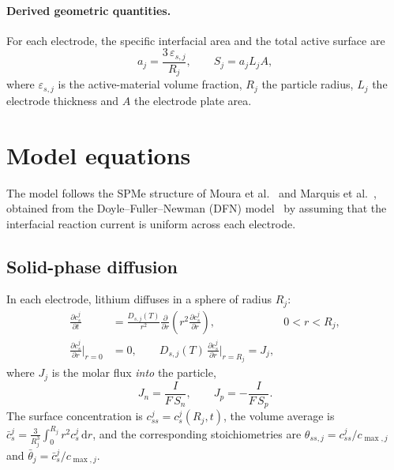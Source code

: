 \documentclass[11pt]{article}
\newcommand{\cs}{c_{s}}
\newcommand{\css}{c_{ss}}
\newcommand{\eps}{\varepsilon}
\newcommand{\dd}{\mathrm{d}}
\newcommand{\pd}[2]{\frac{\partial #1}{\partial #2}}
\begin{document}
\paragraph{Derived geometric quantities.} For each electrode, the specific interfacial area and the total active surface are
\begin{equation}
a_j=\frac{3\,\eps_{s,j}}{R_j},\qquad S_j=a_j L_j A ,
\end{equation}
where $\eps_{s,j}$ is the active-material volume fraction, $R_j$ the particle radius, $L_j$ the electrode thickness and $A$ the electrode plate area.

\section{Model equations}\label{sec:model}

The model follows the SPMe structure of Moura et al.~\cite{moura2017} and Marquis et al.~\cite{marquis2019}, obtained from the Doyle--Fuller--Newman (DFN) model~\cite{doyle1993} by assuming that the interfacial reaction current is uniform across each electrode.

\subsection{Solid-phase diffusion}
In each electrode, lithium diffuses in a sphere of radius $R_j$:
\begin{align}
\pd{\cs^{j}}{t} &= \frac{D_{s,j}(T)}{r^{2}}\pd{}{r}\!\left(r^{2}\pd{\cs^{j}}{r}\right), & 0<r<R_j, \label{eq:solid}\\
\pd{\cs^{j}}{r}\Big|_{r=0} &= 0, \qquad D_{s,j}(T)\,\pd{\cs^{j}}{r}\Big|_{r=R_j}=J_j ,
\end{align}
where $J_j$ is the molar flux \emph{into} the particle,
\begin{equation}
J_n=\frac{I}{F\,S_n},\qquad J_p=-\frac{I}{F\,S_p}. \label{eq:flux}
\end{equation}
The surface concentration is $\css^{j}=\cs^{j}(R_j,t)$, the volume average is $\bar c_s^{j}=\frac{3}{R_j^{3}}\int_0^{R_j} r^{2}\cs^{j}\,\dd r$, and the corresponding stoichiometries are $\theta_{ss,j}=\css^{j}/c_{\max,j}$ and $\bar\theta_j=\bar c_s^{j}/c_{\max,j}$.
\end{document}
